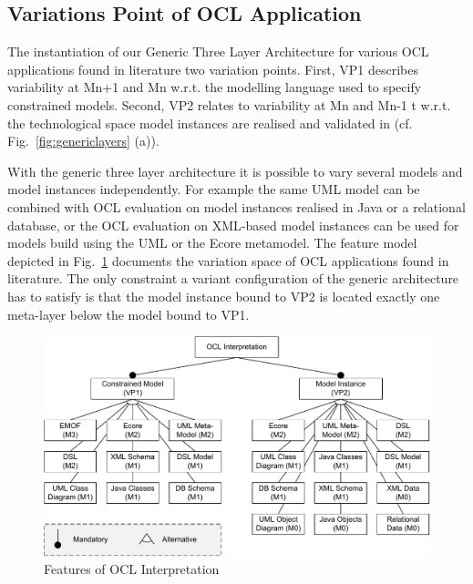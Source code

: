 \subsection{Variations Point of OCL Application}

The instantiation of our Generic Three Layer Architecture for various OCL
applications found in literature  
two variation points. First, VP1 describes variability at Mn+1 and Mn
w.r.t. the modelling language used to specify constrained models. Second, VP2
relates to variability at Mn and Mn-1 t w.r.t. the technological space
model instances are realised and validated in (cf. Fig.~\ref{fig:genericlayers}
(a)). 

With the generic three layer architecture it is possible to vary several
models and model instances independently. For example the same UML model can be
combined with OCL evaluation on model instances realised in Java or a
relational database, or the OCL evaluation on XML-based model instances can be
used for models build using the UML or the Ecore metamodel. The feature model
depicted in Fig.~\ref{fig:features} documents the variation space of OCL
applications found in literature. The only constraint
a variant configuration of the generic architecture has to
satisfy is that the model instance bound to VP2 is located exactly one
meta-layer below the model bound to VP1. 
 \begin{figure}[t]
			\centering
		  \includegraphics[width=1.00\textwidth]{figures/features.pdf}
			\caption{Features of OCL Interpretation}
			\label{fig:features}
	\end{figure}
	
